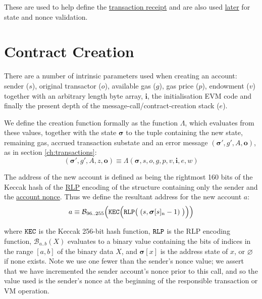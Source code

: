 \documentclass[9pt,oneside]{amsart}
\begin{document}
\begin{multicols}{2}
These are used to help define the \hyperlink{Transaction_Receipt}{transaction receipt} and are also used \hyperlink{Upsilon_pow_g2}{later} for state and nonce validation.

\section{Contract Creation}\label{ch:create}\hypertarget{endow}{}

There are a number of intrinsic parameters used when creating an account: sender ($s$), original transactor ($o$), available gas ($g$), gas price ($p$), endowment ($v$) together with an arbitrary length byte array, $\mathbf{i}$, the initialisation EVM code and finally the present depth of the message-call/contract-creation stack ($e$).

We define the creation function formally as the function $\Lambda$, which evaluates from these values, together with the state $\boldsymbol{\sigma}$ to the tuple containing the new state, remaining gas, accrued transaction substate and an error message $(\boldsymbol{\sigma}', g', A, \mathbf{o})$, as in section \ref{ch:transactions}:
\begin{equation}
(\boldsymbol{\sigma}', g', A, z, \mathbf{o}) \equiv \Lambda(\boldsymbol{\sigma}, s, o, g, p, v, \mathbf{i}, e, w)
\end{equation}

The address of the new account is defined as being the rightmost 160 bits of the Keccak hash of the \hyperlink{rlp}{RLP} encoding of the structure containing only the sender and the \hyperlink{account_nonce}{account nonce}. Thus we define the resultant address for the new account $a$:
\begin{equation}
a \equiv \mathcal{B}_{96..255}\Big(\mathtt{\tiny KEC}\Big(\mathtt{\tiny RLP}\big(\;(s, \boldsymbol{\sigma}[s]_{\mathrm{n}} - 1)\;\big)\Big)\Big)
\end{equation}

where $\mathtt{\tiny KEC}$ is the Keccak 256-bit hash function, $\mathtt{\tiny RLP}$ is the RLP encoding function, $\mathcal{B}_{a..b}(X)$ evaluates to a binary value containing the bits of indices in the range $[a, b]$ of the binary data $X$, and $\boldsymbol{\sigma}[x]$ is the address state of $x$, or $\varnothing$ if none exists. Note we use one fewer than the sender's nonce value; we assert that we have incremented the sender account's nonce prior to this call, and so the value used is the sender's nonce at the beginning of the responsible transaction or VM operation.


\end{multicols}
\end{document}
